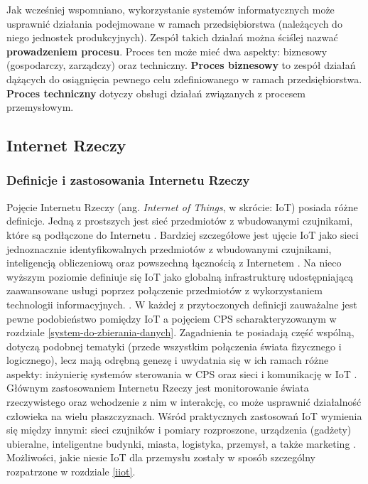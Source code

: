 \documentclass[a4paper, 12pt, twoside]{article}
\begin{document}
Jak wcześniej wspomniano, wykorzystanie systemów informatycznych może usprawnić
działania podejmowane w ramach przedsiębiorstwa (należących do niego jednostek produkcyjnych). 
Zespół takich działań można ściślej nazwać \textbf{prowadzeniem procesu}.
Proces ten może mieć dwa aspekty: biznesowy (gospodarczy, zarządczy) oraz techniczny. 
\textbf{Proces biznesowy} to zespół działań dążących do osiągnięcia pewnego celu
zdefiniowanego w ramach przedsiębiorstwa. \textbf{Proces techniczny} dotyczy
obsługi działań związanych z procesem przemysłowym. 


\subsection{Internet Rzeczy}\label{iot}

\subsubsection{Definicje i zastosowania Internetu Rzeczy}

Pojęcie Internetu Rzeczy (ang. \emph{Internet of Things}, w skrócie: IoT) posiada różne definicje. 
Jedną z prostszych jest sieć przedmiotów z wbudowanymi czujnikami, które są podłączone
do Internetu \cite{intro-to-iot}. Bardziej szczegółowe jest ujęcie IoT jako sieci jednoznacznie
identyfikowalnych przedmiotów z wbudowanymi czujnikami, inteligencją obliczeniową
oraz powszechną łącznością z Internetem \cite{iot-hype-to-reality}.
Na nieco wyższym poziomie definiuje się IoT jako globalną infrastrukturę udostępniającą
zaawansowane usługi poprzez połączenie przedmiotów z wykorzystaniem technologii informacyjnych.
\cite{intro-to-iot}. W każdej z przytoczonych
definicji zauważalne jest pewne podobieństwo pomiędzy IoT a pojęciem CPS 
scharakteryzowanym w rozdziale \ref{system-do-zbierania-danych}. Zagadnienia te
posiadają część wspólną, dotyczą podobnej tematyki (przede wszystkim połączenia świata fizycznego i logicznego), 
lecz mają odrębną genezę i uwydatnia się w ich ramach różne aspekty: 
inżynierię systemów sterowania w CPS oraz sieci i komunikację w IoT \cite{cps-vs-iot}.
Głównym zastosowaniem Internetu Rzeczy jest monitorowanie świata rzeczywistego 
oraz wchodzenie z nim w interakcję, co może usprawnić działalność człowieka na wielu płaszczyznach.
Wśród praktycznych zastosowań IoT wymienia się między innymi:
sieci czujników i pomiary rozproszone, urządzenia (gadżety) ubieralne, 
inteligentne budynki, miasta, logistyka, przemysł, a także marketing \cite{internet-reczy}. 
Możliwości, jakie niesie IoT dla przemysłu zostały w sposób szczególny rozpatrzone 
w rozdziale \ref{iiot}.
\end{document}
